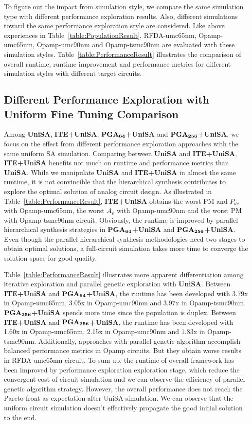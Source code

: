       To figure out the impact from simulation style, we compare the same simulation type with different performance exploration results. Also, different simulations toward the same performance exploration style are considered. Like above experiences in Table~\ref{table:PopulationResult}, RFDA-umc65nm, Opamp-umc65nm, Opamp-umc90nm and Opamp-tsmc90nm are evaluated with these simulation styles. Table~\ref{table:PerformanceResult} illustrates the comparison of overall runtime, runtime improvement and performance metrics for different simulation styles with different target circuits.
    
    \subsection{Different Performance Exploration with Uniform Fine Tuning Comparison}\label{sec:ExPSUniFT}

      Among {\bf UniSA}, {\bf ITE+UniSA}, {$\bf PGA_{64}$\bf+UniSA} and {$\bf PGA_{256}$\bf+UniSA}, we focus on the effect from different performance exploration approaches with the same uniform SA simulation. Comparing between {\bf UniSA} and {\bf ITE+UniSA}, {\bf ITE+UniSA} benefits not much on runtime and performance metrics than {\bf UniSA}. While we manipulate {\bf UniSA} and {\bf ITE+UniSA} in almost the same runtime, it is not convincible that the hierarchical synthesis contributes to explore the optimal solution of analog circuit design. As illustrated in Table~\ref{table:PerformanceResult}, {\bf ITE+UniSA} obtains the worst PM and $P_{dc}$ with Opamp-umc65nm, the worst $A_v$ with Opamp-umc90nm and the worst PM with Opamp-tsmc90nm circuit. Obviously, the runtime is improved by parallel hierarchical synthesis strategies in {$\bf PGA_{64}$\bf+UniSA} and {$\bf PGA_{256}$\bf+UniSA}. Even though the parallel hierarchical synthesis methodologies need two stages to obtain optimal solutions, a full-circuit simulation takes more time to converge the solution space for good quality. 

      Table~\ref{table:PerformanceResult} illustrates more apparent differentiation among iterative exploration and parallel genetic exploration with {\bf UniSA}. Between {\bf ITE+UniSA} and {$\bf PGA_{64}$\bf+UniSA}, the runtime has been developed with 3.79x in Opamp-umc65nm, 3.05x in Opamp-umc90nm and 3.97x in Opamp-tsmc90nm. {$\bf PGA_{256}$\bf+UniSA} spends more time since the population is duplex. Between {\bf ITE+UniSA} and {$\bf PGA_{256}$\bf+UniSA}, the runtime has been developed with 1.60x in Opamp-umc65nm, 2.15x in Opamp-umc90nm and 1.83x in Opamp-tsmc90nm. Additionally, approaches with parallel genetic algorithm accomplish balanced performance metrics in Opamp circuits. But they obtain worse results in RFDA-umc65nm circuit. To sum up, the runtime of overall framework has been improved by performance exploration exploration stage, which reduce the convergent cost of circuit simulation and we can observe the efficiency of parallel genetic algorithm strategy. However, the overall performance does not reach the Pareto-front as expectation after UniSA simulation. We can observe that the uniform circuit simulation doesn't effectively propagate the good initial solution to the end. 

